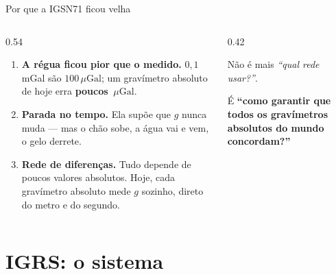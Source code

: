 \documentclass[aspectratio=169,11pt]{beamer}
\newcommand{\bnum}[1]{\textbf{\textcolor{mTeal}{#1}}}
\newcommand{\uGal}{\ensuremath{\,\mu\mathrm{Gal}}\xspace}
\begin{document}
\begin{frame}{Por que a IGSN71 ficou velha}
  \begin{columns}[T]
    \begin{column}{0.54\textwidth}
      \begin{enumerate}
        \setlength{\itemsep}{4pt}
        \item \textbf{A régua ficou pior que o medido.} $0{,}1$ mGal são $100$\uGal; um
              gravímetro absoluto de hoje erra \bnum{poucos \uGal}.
        \item \textbf{Parada no tempo.} Ela supõe que $g$ nunca muda --- mas o chão sobe,
              a água vai e vem, o gelo derrete.
        \item \textbf{Rede de diferenças.} Tudo depende de poucos valores absolutos. Hoje,
              cada gravímetro absoluto mede $g$ sozinho, direto do metro e do segundo.
      \end{enumerate}
    \end{column}
    \begin{column}{0.42\textwidth}
      \begin{ideia}[title={A pergunta mudou}]
        Não é mais \emph{``qual rede usar?''}.
        \medskip

        É \bnum{``como garantir que todos os gravímetros absolutos do mundo concordam?''}
      \end{ideia}
    \end{column}
  \end{columns}
\end{frame}

\section{IGRS: o sistema}
\end{document}
